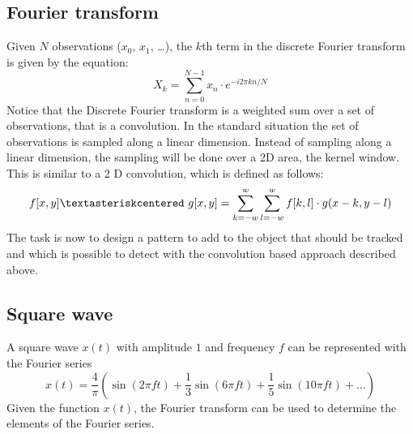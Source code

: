 \documentclass{article}
\begin{document}
\subsection{Fourier transform} 
Given $N$ observations ($x_0$, $x_1$, \ldots), the $k$th term in 
the discrete Fourier transform is given by the equation: 
\[ 
X_{k}=\sum _{n=0}^{N-1} x_{n} \cdot e^{-i2\pi kn/N} 
\] 
Notice that the Discrete Fourier transform is a weighted sum over a set of observations, that is a convolution. 
In the standard situation the set of observations is sampled along a linear dimension. 
Instead of sampling along a linear dimension, the sampling will be done over a 2D area, the kernel window. 
This is similar to a 2 D convolution, which is defined as follows: 
\[ 
f[x, y] \textasteriskcentered  g[x, y] = \sum_{k = -w}^{w} \sum_{l = -w}^{w} f[k, l] \cdot g(x - k, y - l) 
\] 
The task is now to design a pattern to add to the object that should be tracked 
and which is possible to detect with the convolution based approach described above. 
\subsection{Square wave} 
A square wave $x(t)$ with amplitude $1$ and frequency $f$ can be represented with the Fourier series 
\[ 
x(t)=\frac{4}{\pi} \left(\sin(2\pi ft)+\frac{1}{3} \sin(6 \pi f t) + \frac{1}{5} \sin(10 \pi f t) + \ldots \right) 
\] 
Given the function $x(t)$, the Fourier transform can be used to determine the elements 
of the Fourier series. 
\end{document}

